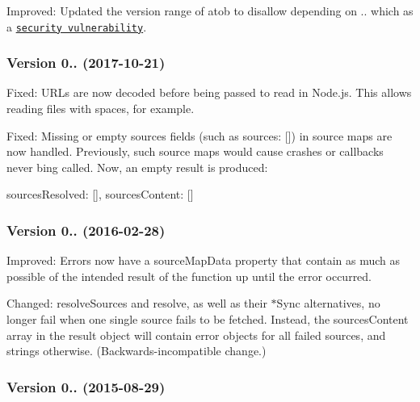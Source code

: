 
\begin{DoxyItemize}
\item Improved\+: Updated the version range of {\ttfamily atob} to disallow depending on {..} which as a \href{https://snyk.io/test/npm/atob/2.0.3?severity=high&severity=medium&severity=low}{\tt security vulnerability}.
\end{DoxyItemize}

\subsubsection*{Version 0.. (2017-\/10-\/21)}


\begin{DoxyItemize}
\item Fixed\+: U\+R\+Ls are now decoded before being passed to {\ttfamily read} in Node.\+js. This allows reading files with spaces, for example.
\item Fixed\+: Missing or empty {\ttfamily sources} fields (such as {\ttfamily sources\+: \mbox{[}\mbox{]}}) in source maps are now handled. Previously, such source maps would cause crashes or callbacks never bing called. Now, an empty result is produced\+:
\end{DoxyItemize}


\begin{DoxyCode}
sourcesResolved: [],
sourcesContent: []
\end{DoxyCode}


\subsubsection*{Version 0.. (2016-\/02-\/28)}


\begin{DoxyItemize}
\item Improved\+: Errors now have a {\ttfamily source\+Map\+Data} property that contain as much as possible of the intended result of the function up until the error occurred.
\item Changed\+: {\ttfamily resolve\+Sources} and {\ttfamily resolve}, as well as their {\ttfamily $\ast$\+Sync} alternatives, no longer fail when one single source fails to be fetched. Instead, the {\ttfamily sources\+Content} array in the result object will contain error objects for all failed sources, and strings otherwise. (Backwards-\/incompatible change.)
\end{DoxyItemize}

\subsubsection*{Version 0.. (2015-\/08-\/29)}



